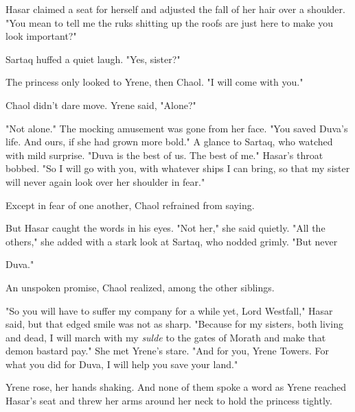 Hasar claimed a seat for herself and adjusted the fall of her hair over a shoulder. "You mean to tell me the ruks shitting up the roofs are just here to make you look important?"

Sartaq huffed a quiet laugh. "Yes, sister?"

The princess only looked to Yrene, then Chaol. "I will come with you."

Chaol didn't dare move. Yrene said, "Alone?"

"Not alone." The mocking amusement was gone from her face. "You saved Duva's life. And ours, if she had grown more bold." A glance to Sartaq, who watched with mild surprise. "Duva is the best of us. The best of me." Hasar's throat bobbed. "So I will go with you, with whatever ships I can bring, so that my sister will never again look over her shoulder in fear."

Except in fear of one another, Chaol refrained from saying.

But Hasar caught the words in his eyes. "Not her," she said quietly. "All the others," she added with a stark look at Sartaq, who nodded grimly. "But never

Duva."

An unspoken promise, Chaol realized, among the other siblings.

"So you will have to suffer my company for a while yet, Lord Westfall," Hasar said, but that edged smile was not as sharp. "Because for my sisters, both living and dead, I will march with my \emph{sulde}
to the gates of Morath and make that demon bastard pay." She met Yrene's stare. "And for you, Yrene Towers. For what you did for Duva, I will help you save your land."

Yrene rose, her hands shaking. And none of them spoke a word as Yrene reached Hasar's seat and threw her arms around her neck to hold the princess tightly.

